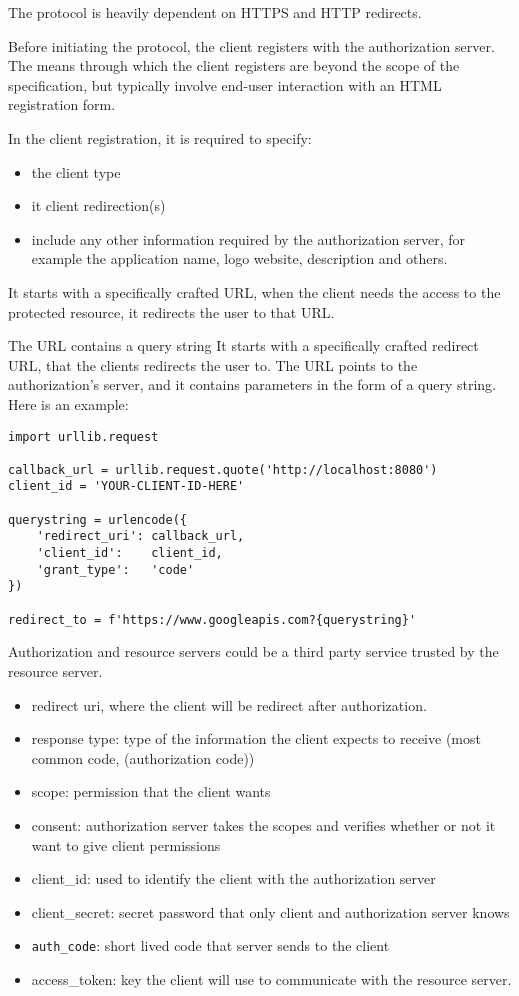 The protocol is heavily dependent on HTTPS and HTTP redirects.

Before initiating the protocol, the client registers with the authorization
server.
The means through which the client registers are beyond the scope of the
specification, but typically involve end-user interaction with an HTML
registration form.

In the client registration, it is required to specify:
\begin{itemize}
    \item the client type
    \item it client redirection(s)
    \item include any other information required by the authorization server,
        for example the application name, logo website, description and others.
\end{itemize}

It starts with a specifically crafted URL, when the client needs the access to
the protected resource, it redirects the user to that URL.

The URL contains a query string
It starts with a specifically crafted redirect URL, that the clients
redirects the user to.
The URL points to the authorization's server, and it contains parameters in the
form of a query string. Here is an example:

\begin{lstlisting}
import urllib.request

callback_url = urllib.request.quote('http://localhost:8080')
client_id = 'YOUR-CLIENT-ID-HERE'

querystring = urlencode({
    'redirect_uri': callback_url,
    'client_id':    client_id,
    'grant_type':   'code'
})

redirect_to = f'https://www.googleapis.com?{querystring}'
\end{lstlisting}


Authorization and resource servers could be a third party service trusted by the
resource server.

\begin{itemize}
    \item  redirect uri, where the client will be redirect after authorization.
    \item  response type: type of the information the client expects to receive
        (most common code, (authorization code))
    \item  scope: permission that the client wants
    \item  consent: authorization server takes the scopes and verifies whether or not
        it want to give client permissions
    \item  client\_id: used to identify the client with the authorization server
    \item  client\_secret: secret password that only client and authorization server knows
    \item  \texttt{auth\_code}: short lived code that server sends to the client
    \item access\_token: key the client will use to communicate with the resource server.
\end{itemize}

